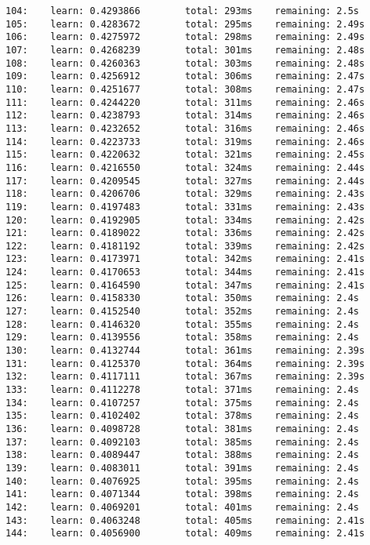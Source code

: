 \documentclass[11pt]{article}
\begin{document}
\begin{Verbatim}[commandchars=\\\{\}]
104:    learn: 0.4293866        total: 293ms    remaining: 2.5s
105:    learn: 0.4283672        total: 295ms    remaining: 2.49s
106:    learn: 0.4275972        total: 298ms    remaining: 2.49s
107:    learn: 0.4268239        total: 301ms    remaining: 2.48s
108:    learn: 0.4260363        total: 303ms    remaining: 2.48s
109:    learn: 0.4256912        total: 306ms    remaining: 2.47s
110:    learn: 0.4251677        total: 308ms    remaining: 2.47s
111:    learn: 0.4244220        total: 311ms    remaining: 2.46s
112:    learn: 0.4238793        total: 314ms    remaining: 2.46s
113:    learn: 0.4232652        total: 316ms    remaining: 2.46s
114:    learn: 0.4223733        total: 319ms    remaining: 2.46s
115:    learn: 0.4220632        total: 321ms    remaining: 2.45s
116:    learn: 0.4216550        total: 324ms    remaining: 2.44s
117:    learn: 0.4209545        total: 327ms    remaining: 2.44s
118:    learn: 0.4206706        total: 329ms    remaining: 2.43s
119:    learn: 0.4197483        total: 331ms    remaining: 2.43s
120:    learn: 0.4192905        total: 334ms    remaining: 2.42s
121:    learn: 0.4189022        total: 336ms    remaining: 2.42s
122:    learn: 0.4181192        total: 339ms    remaining: 2.42s
123:    learn: 0.4173971        total: 342ms    remaining: 2.41s
124:    learn: 0.4170653        total: 344ms    remaining: 2.41s
125:    learn: 0.4164590        total: 347ms    remaining: 2.41s
126:    learn: 0.4158330        total: 350ms    remaining: 2.4s
127:    learn: 0.4152540        total: 352ms    remaining: 2.4s
128:    learn: 0.4146320        total: 355ms    remaining: 2.4s
129:    learn: 0.4139556        total: 358ms    remaining: 2.4s
130:    learn: 0.4132744        total: 361ms    remaining: 2.39s
131:    learn: 0.4125370        total: 364ms    remaining: 2.39s
132:    learn: 0.4117111        total: 367ms    remaining: 2.39s
133:    learn: 0.4112278        total: 371ms    remaining: 2.4s
134:    learn: 0.4107257        total: 375ms    remaining: 2.4s
135:    learn: 0.4102402        total: 378ms    remaining: 2.4s
136:    learn: 0.4098728        total: 381ms    remaining: 2.4s
137:    learn: 0.4092103        total: 385ms    remaining: 2.4s
138:    learn: 0.4089447        total: 388ms    remaining: 2.4s
139:    learn: 0.4083011        total: 391ms    remaining: 2.4s
140:    learn: 0.4076925        total: 395ms    remaining: 2.4s
141:    learn: 0.4071344        total: 398ms    remaining: 2.4s
142:    learn: 0.4069201        total: 401ms    remaining: 2.4s
143:    learn: 0.4063248        total: 405ms    remaining: 2.41s
144:    learn: 0.4056900        total: 409ms    remaining: 2.41s

\end{Verbatim}
\end{document}
